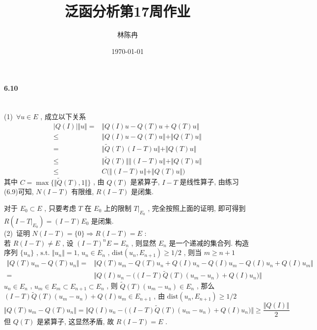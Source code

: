 \documentclass[a4paper, UTF8]{ctexart}				%
\title{泛函分析第17周作业}
\author{林陈冉}
\date{\today}
\numberwithin{equation}{section}				%
\begin{document}
    \maketitle										%
    \paragraph{6.10}\quad\\
        \noindent (1) \,$\forall u \in E$ , 成立以下关系
        \begin{equation*}
            \begin{split}
                    \vert{Q(I)}\vert \Vert{u}\Vert
                =   & \Vert{Q(I)u - Q(T)u + Q(T)u}\Vert\\
                \le & \Vert{Q(I)u - Q(T)u}\Vert + \Vert{Q(T)u}\Vert\\
                =   & \Vert{\tilde{Q}(T) (I - T)u}\Vert + \Vert{Q(T)u}\Vert\\
                \le & \Vert{\tilde{Q}(T)}\Vert \Vert{(I - T)u}\Vert + \Vert{Q(T)u}\Vert\\
                \le & C \Big(\Vert{(I - T)u}\Vert + \Vert{Q(T)u}\Vert \Big)
            \end{split}
        \end{equation*}
        其中 $C = \max \{\Vert{\tilde{Q}(T), 1}\Vert\}$ , 由 $Q(T)$ 是紧算子, $I - T$ 是线性算子, 由练习(6.9)可知, $N(I - T)$ 有限维, $R(I - T)$ 是闭集.

        对于 $E_0 \subset E$ , 只要考虑 $T$ 在 $E_0$ 上的限制 $T|_{E_0}$ , 完全按照上面的证明, 即可得到 $R(I - T|_{E_0}) = (I - T)E_0$ 是闭集.\\
        
        \noindent (2) \,证明 $N(I - T) = \{0\} \Rightarrow R(I - T) = E$ :\\
        若 $R(I - T) \neq E$ , 设 $(I -T)^n E = E_n$ , 则显然 $E_n$ 是一个递减的集合列. 构造序列 $\{u_n\}$ , $\text{s.t. } \Vert{u_n}\Vert = 1$, $u_n \in E_n$ , $\text{dist}(u_n, E_{n + 1}) \ge 1/2$ , 则当 $m \ge n + 1$ 
        \begin{equation*}
            \begin{split}
                    \Vert{Q(T)u_m - Q(T)u_n}\Vert
                =   & \Vert{Q(T)u_m - Q(T)u_n + Q(I)u_n - Q(I)u_m - Q(I)u_n + Q(I)u_m}\Vert\\
                =   & \Vert{Q(I)u_n - \big((I - T)\tilde{Q}(T)(u_m - u_n) + Q(I)u_n \big)}\Vert
            \end{split}
        \end{equation*}
        $u_n \in E_n$ , $u_m \in E_m \subset E_{n + 1} \subset E_n$ , 则 $\tilde{Q}(T)(u_m -u_n) \in E_n$ , 那么 $(I - T)\tilde{Q}(T)(u_m - u_n) + Q(I)u_m \in E_{n + 1}$ , 由 $\text{dist}(u_n, E_{n + 1}) \ge 1/2$
        \[
            \Vert{Q(T)u_m - Q(T)u_n}\Vert = \Vert{Q(I)u_n - \big((I - T)\tilde{Q}(T)(u_m - u_n) + Q(I)u_n \big)}\Vert \ge \frac{\Vert{Q(I)}\Vert}{2}
        \]
        但 $Q(T)$ 是紧算子, 这显然矛盾, 故 $R(I - T) = E$ .
\end{document}
